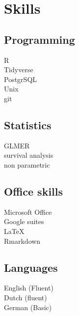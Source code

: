 \documentclass[letterpaper]{deedy-resume} %
\begin{document}
\begin{minipage}[t]{0.33\textwidth} %


\section{Skills}
\subsection{Programming}
R\\
Tidyverse\\
PostgrSQL\\
Unix\\
git\\

\sectionspace %
\subsection{Statistics}
GLMER \\
survival analysis\\
non parametric\\



\sectionspace %
\subsection{Office skills}
Microsoft Office\\
Google suites\\
\LaTeX\\
Rmarkdown\\

\sectionspace %
\subsection{Languages}
English (Fluent)\\
Dutch (fluent)\\
German (Basic)\\



\end{minipage}
\end{document}
